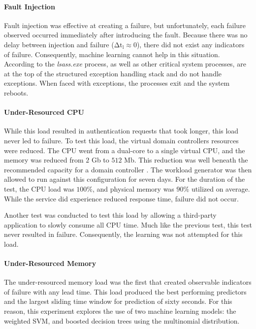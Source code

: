 \paragraph{Fault Injection}
Fault injection was effective at creating a failure, but unfortunately, each
failure observed occurred immediately after introducing the fault.  Because
there was no delay between injection and failure ($\mathrm{\Delta t_l \approx
0}$), there did not exist any indicators of failure.  Consequently, machine
learning cannot help in this situation.  According to \citet{russinovich2009}
the \emph{lsass.exe} process, as well as other critical system processes, are
at the top of the structured exception handling stack and do not handle
exceptions.  When faced with exceptions, the processes exit and the system
reboots.

\paragraph{Under-Resourced \ac{CPU}}
While this load resulted in authentication requests that took longer, this load
never led to failure.  To test this load, the virtual domain controllers
resources were reduced.  The \ac{CPU} went from a dual-core to a single virtual
CPU, and the memory was reduced from $2$ Gb to $512$ Mb.  This reduction was
well beneath the recommended capacity for a domain controller \citep{mak12}.
The workload generator was then allowed to run against this configuration for
seven days.  For the duration of the test, the \ac{CPU} load was $100\%$, and
physical memory was $90\%$ utilized on average.  While the service did
experience reduced response time, failure did not occur.

Another test was conducted to test this load by allowing a third-party
application to slowly consume all \ac{CPU} time.  Much like the previous test,
this test never resulted in failure.  Consequently, the learning was not
attempted for this load.

\paragraph{Under-Resourced Memory}
The under-resourced memory load was the first that created observable
indicators of failure with any lead time.  This load produced the best
performing predictors and the largest sliding time window for prediction of
sixty seconds.  For this reason, this experiment explores the use of two
machine learning models: the weighted \ac{SVM}, and boosted decision trees
using the multinomial distribution.  

